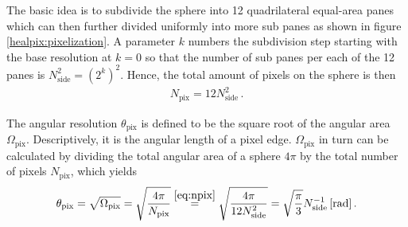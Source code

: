 The basic idea is to subdivide the sphere into 12 quadrilateral equal-area panes which can then further divided uniformly into more sub panes as shown in figure \ref{healpix:pixelization}. A parameter $k$ numbers the subdivision step starting with the base resolution at $k=0$ so that the number of sub panes per each of the 12 panes is $N_{\text{side}}^2=\left(2^k\right)^2$. Hence, the total amount of pixels on the sphere is then \cite{healpix:paper}
\begin{align}
N_\text{pix} = 12N_\text{side}^2\,.
\label{eq:npix}
\end{align}

The angular resolution $\theta_\text{pix}$ is defined to be the square root of the angular area $\Omega_\text{pix}$. Descriptively, it is the angular length of a pixel edge. $\Omega_\text{pix}$ in turn can be calculated by dividing the total angular area of a sphere $4\pi$ by the total number of pixels $N_\text{pix}$, which yields \cite{healpix:paper}
\begin{align}
	\theta_\text{pix} = \sqrt{\Omega_\text{pix}} = \sqrt{\frac{4\pi}{N_\text{pix}}} \overset{\eqref{eq:npix}}{=} \sqrt{\frac{4\pi}{12N_\text{side}^2}} = \sqrt{\frac{\pi}{3}}N_\text{side}^{-1}\,[\si{\radian}]\,.
\end{align} 

